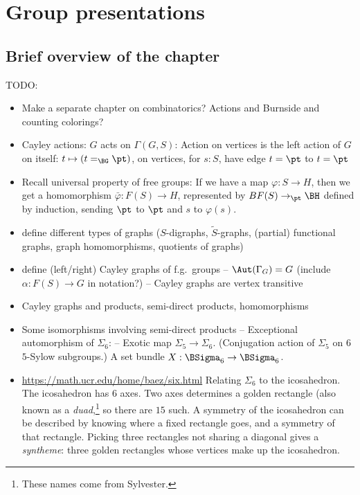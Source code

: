 \chapter{Group presentations}
\label{ch:fggroups}

\section{Brief overview of the chapter}
\label{sec:fggroups-overview}

TODO:
\begin{itemize}
\item Make a separate chapter on combinatorics? Actions and Burnside and counting colorings?
\item Cayley actions: $G$ acts on $\Gamma(G,S)$: Action on vertices is the left action of $G$ on itself: $t \mapsto (t=_{\BG} \pt)$, on vertices, for $s : S$, have edge $t = \pt$ to $t = \pt$
\item Recall universal property of free groups: If we have a map $\varphi : S \to H$, then we get a homomorphism $\bar\varphi : F(S) \to H$, represented by $BF(S) \to_\pt \BH$ defined by induction, sending $\pt$ to $\pt$ and $s$ to $\varphi(s)$.
\item define different types of graphs ($S$-digraphs, $\tilde S$-graphs,
  (partial) functional graphs, graph homomorphisms, quotients of graphs)
\item define (left/right) Cayley graphs of f.g.~groups
  -- $\Aut(\Gamma_G) = G$ (include $\alpha : F(S) \to G$ in notation?)
  -- Cayley graphs are vertex transitive
\item Cayley graphs and products, semi-direct products, homomorphisms
\item Some isomorphisms involving semi-direct products
  -- Exceptional automorphism of $\Sigma_6$:
  -- Exotic map $\Sigma_5 \to \Sigma_6$.
  (Conjugation action of $\Sigma_5$ on $6$ $5$-Sylow subgroups.)
  A set bundle $X : \BSigma_6 \to \BSigma_6$.
\item \url{https://math.ucr.edu/home/baez/six.html}
  Relating $\Sigma_6$ to the icosahedron.
  The icosahedron has $6$ axes. Two axes determines a golden rectangle (also known as a \emph{duad},\footnote{%
    These names come from Sylvester.}
  so there are $15$ such. A symmetry of the icosahedron can be described
  by knowing where a fixed rectangle goes, and a symmetry of that rectangle.
  Picking three rectangles not sharing a diagonal gives a \emph{syntheme}:
  three golden rectangles whose vertices make up the icosahedron.

\end{itemize}
